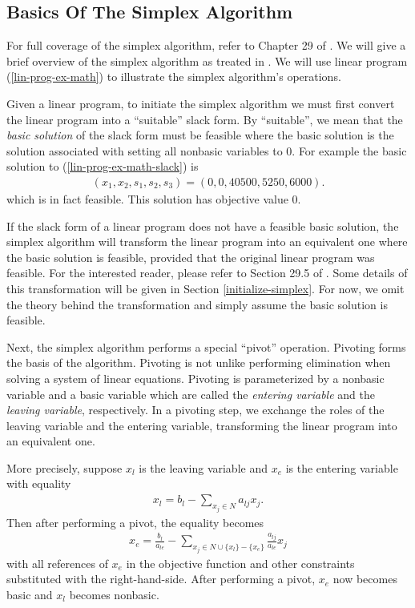 \documentclass{article}
\begin{document}
\subsection{Basics Of The Simplex Algorithm}
For full coverage of the simplex algorithm, refer to Chapter 29 of \cite{CLRS}. We will give a brief overview of the simplex algorithm as treated in \cite{CLRS}. We will use linear program (\ref{lin-prog-ex-math}) to illustrate the simplex algorithm's operations.

Given a linear program, to initiate the simplex algorithm we must first convert the linear program into a ``suitable'' slack form. By ``suitable'', we mean that the \textit{basic solution} of the slack form must be feasible where the basic solution is the solution associated with setting all nonbasic variables to $0$. For example the basic solution to (\ref{lin-prog-ex-math-slack}) is 
\begin{align*}
(x_1, x_2, s_1, s_2, s_3) = (0, 0, 40500, 5250, 6000).
\end{align*}
which is in fact feasible. This solution has objective value $0$. 

If the slack form of a linear program does not have a feasible basic solution, the simplex algorithm will transform the linear program into an equivalent one where the basic solution is feasible, provided that the original linear program was feasible. For the interested reader, please refer to Section 29.5 of \cite{CLRS}. Some details of this transformation will be given in Section \ref{initialize-simplex}. For now, we omit the theory behind the transformation and simply assume the basic solution is feasible.

Next, the simplex algorithm performs a special ``pivot'' operation. Pivoting forms the basis of the algorithm. Pivoting is not unlike performing elimination when solving a system of linear equations. Pivoting is parameterized by a nonbasic variable and a basic variable which are called the \textit{entering variable} and the \textit{leaving variable}, respectively. In a pivoting step, we exchange the roles of the leaving variable and the entering variable, transforming the linear program into an equivalent one. 

More precisely, suppose $x_l$ is the leaving variable and $x_e$ is the entering variable with equality
\begin{align*}
    x_l = b_l - \sum_{x_j \in N} a_{lj} x_j.
\end{align*}
Then after performing a pivot, the equality becomes
\begin{align*}
    x_e = \frac{b_l}{a_{le}} - \sum_{x_j \in N \cup \{x_l\} - \{x_e\}} \frac{a_{lj}}{a_{le}} x_j 
\end{align*}
with all references of $x_e$ in the objective function and other constraints substituted with the right-hand-side. After performing a pivot, $x_e$ now becomes basic and $x_l$ becomes nonbasic.
\end{document}

